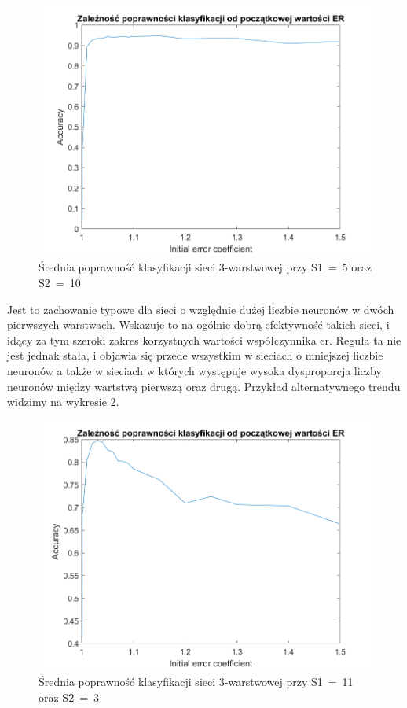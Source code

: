 \documentclass[12pt,twoside]{article}
\begin{document}
\begin{figure}[ht]
	\centering
	\includegraphics[width=16cm]{figures/Er_2.png}
	\caption{Średnia poprawność klasyfikacji sieci 3-warstwowej przy S1~=~5 oraz S2~=~10}
	\label{Fig:Er2}
\end{figure}

Jest to zachowanie typowe dla sieci o względnie dużej liczbie neuronów w dwóch pierwszych warstwach.
Wskazuje to na ogólnie dobrą efektywność takich sieci, i idący za tym szeroki zakres korzystnych wartości współczynnika er.
Reguła ta nie jest jednak stała, i objawia się przede wszystkim w sieciach o mniejszej liczbie neuronów a także w sieciach w których występuje wysoka dysproporcja liczby neuronów między wartstwą pierwszą oraz drugą.
Przykład alternatywnego trendu widzimy na wykresie \ref{Fig:Er3}.

\begin{figure}[ht]
	\centering
	\includegraphics[width=16cm]{figures/Er_3.png}
	\caption{Średnia poprawność klasyfikacji sieci 3-warstwowej przy S1~=~11 oraz S2~=~3}
	\label{Fig:Er3}
\end{figure}
\end{document}
